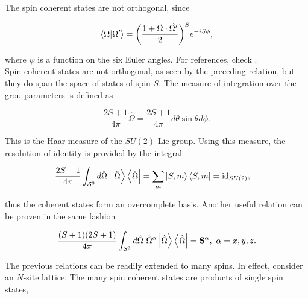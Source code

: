 \documentclass{homework}
\begin{document}
The spin coherent states are not orthogonal, since 

$$
    \bra{\Omega} \ket{\Omega'} = \bigg(\frac{1+\hat{\Omega} \cdot \hat{\Omega'}}{2}\bigg)^S e^{-iS\phi},
$$

where $\psi$ is a function on the six Euler angles. For references, check \cite{assa}. \\

Spin coherent states are not orthogonal, as seen by the preceding relation, but they do span the space of states of spin $S$. The measure of integration over the grou parameters is defined as 

\begin{equation}
    \frac{2S+1}{4\pi} \hat{\Omega} = \frac{2S+1}{4\pi} d\theta \sin \theta d\phi.
\end{equation}

This is the Haar measure of the $SU(2)$-Lie group. Using this measure, the resolution of identity is provided by the integral

\begin{equation}
    \begin{split}
        \frac{2S+1}{4\pi} \int_{\mathcal{S}^3} d\hat{\Omega} \blanky \ket{\hat{\Omega}} \bra{\hat{\Omega}} %
        &= \sum_{m} \ket{S,m}\bra{S,m} = \textnormal{id}_{SU(2)},
        \label{spin_coherent_resol_id}
    \end{split}
\end{equation}

thus the coherent states form an overcomplete basis. Another useful relation can be proven in the same fashion 

\begin{equation}
    \frac{(S+1)(2S+1)}{4\pi} \int_{\mathcal{S}^3} d\hat{\Omega} \textnormal{ } {\hat{\Omega}}^\alpha \ket{\hat{\Omega}} \bra{\hat{\Omega}} = {\bf S}^{\alpha}, \textnormal{ } \alpha = x,y,z.
    \label{spin_coherent_resol_spin_ops}
\end{equation}

The previous relations can be readily extended to many spins. In effect, consider an $N$-site lattice. The many spin coherent states are products of single spin states, 
\end{document}
